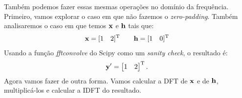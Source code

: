 \documentclass{homeworkclass}
\begin{document}
\begin{homeworkProblem}
	Também podemos fazer essas mesmas operações no domínio da frequência. Primeiro, vamos explorar o caso em que não fazemos o \textit{zero-padding}.
	Também analisaremos o caso em que temos $\mathbf{x}$ e $\mathbf{h}$ tais que:
	\begin{equation*}
	\mathbf{x} = [1 \quad 2]^{\mathrm{T}} \qquad
	\mathbf{h} = [1 \quad 0]^{\mathrm{T}}
	\end{equation*}
	Usando a função \textit{fftconvolve} do Scipy como um \textit{sanity check}, o resultado é:
	\begin{equation*}
	\mathbf{y}^\prime = \begin{bmatrix}
	1 \quad 2
	\end{bmatrix}^{\mathrm{T}}.
	\end{equation*}
	Agora vamos fazer de outra forma. Vamos calcular a DFT de $\mathbf{x}$ e de $\mathbf{h}$, multiplicá-los e calcular a IDFT do resultado.
	

\end{homeworkProblem}
\end{document}
